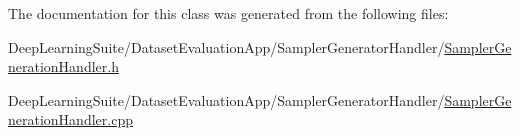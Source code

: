 The documentation for this class was generated from the following files\+:\begin{DoxyCompactItemize}
\item 
Deep\+Learning\+Suite/\+Dataset\+Evaluation\+App/\+Sampler\+Generator\+Handler/\hyperlink{_sampler_generation_handler_8h}{Sampler\+Generation\+Handler.\+h}\item 
Deep\+Learning\+Suite/\+Dataset\+Evaluation\+App/\+Sampler\+Generator\+Handler/\hyperlink{_sampler_generation_handler_8cpp}{Sampler\+Generation\+Handler.\+cpp}\end{DoxyCompactItemize}
